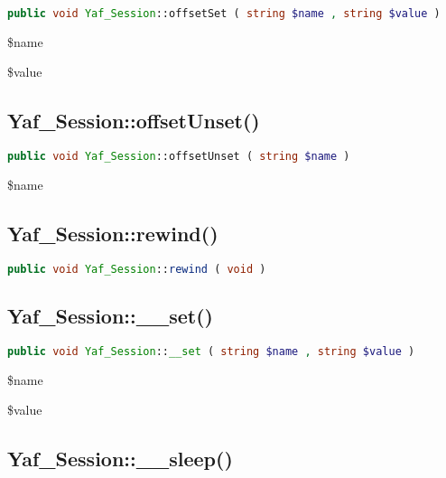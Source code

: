 \begin{lstlisting}[language=PHP]
public void Yaf_Session::offsetSet ( string $name , string $value )
\end{lstlisting}

\begin{compactitem}
\item \$name
\item \$value
\end{compactitem}


\subsection{Yaf\_Session::offsetUnset()}





\begin{lstlisting}[language=PHP]
public void Yaf_Session::offsetUnset ( string $name )
\end{lstlisting}

\begin{compactitem}
\item \$name
\end{compactitem}


\subsection{Yaf\_Session::rewind()}


\begin{lstlisting}[language=PHP]
public void Yaf_Session::rewind ( void )
\end{lstlisting}

\subsection{Yaf\_Session::\_\_set()}

\begin{lstlisting}[language=PHP]
public void Yaf_Session::__set ( string $name , string $value )
\end{lstlisting}

\begin{compactitem}
\item \$name
\item \$value
\end{compactitem}


\subsection{Yaf\_Session::\_\_sleep()}



